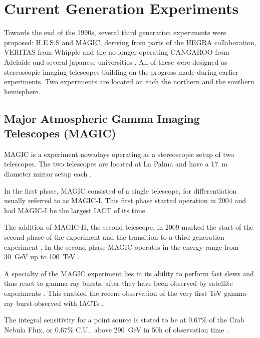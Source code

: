 \section{Current Generation Experiments}

Towards the end of the 1990s, several third generation experiments were
proposed:
H.E.S.S and MAGIC, deriving from parts of the HEGRA collaboration, 
VERITAS from Whipple and the no longer operating CANGAROO from Adelaide and 
several japanese universities \cite{HILLAS201319}. All of these
were designed as stereoscopic imaging telescopes building on the progress made during 
earlier experiments. Two experiments are located on each the northern and the southern hemisphere.

\subsection{Major Atmospheric Gamma Imaging Telescopes (MAGIC)}
MAGIC is a experiment nowadays operating as a stereoscopic setup of two telescopes.
The two telescopes are located at La Palma and have a \SI{17}{\meter} diameter mirror setup each \cite{ALEKSIC201676}.

In the first phase, MAGIC consisted of a single telescope, for differentiation usually
referred to as MAGIC-I. This first phase started 
operation in 2004 and had MAGIC-I be the largest IACT of its time.

The addition of MAGIC-II, the second telescope, in 2009 marked the 
start of the second phase of the experiment and the transition to a third 
generation experiment \cite{2009arXiv0907.1211C}.
In the second phase MAGIC operates in the energy range from \SI{30}{\giga\eV}
up to \SI{100}{\TeV} \cite{magic_website}.


A specialty of the MAGIC experiment lies in its ability to 
perform fast slews and thus react to gamma-ray bursts, after they have been observed 
by satellite experiments \cite{2003ICRC....5.2943B}.
This enabled the recent observation of the very first \si{\TeV}
gamma-ray burst observed with IACTs \cite{collaboration2019teraelectronvolt}.

The integral sensitivity for a point source is stated to be at
0.67\% of the Crab Nebula Flux, or 0.67\% C.U., above \SI{290}{\giga\electronvolt} 
in 50h of observation time \cite{magic_website}.


